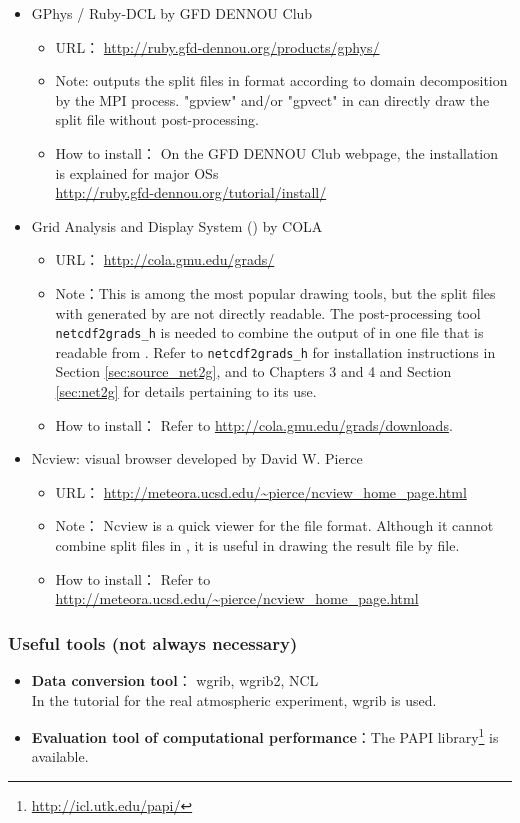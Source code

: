\begin{itemize}
\item GPhys / Ruby-DCL by GFD DENNOU Club
 \begin{itemize}
  \item URL： \url{http://ruby.gfd-dennou.org/products/gphys/}
  \item Note: \scalelib outputs the split files
  in {\netcdf} format according to domain decomposition by the MPI process.
  "gpview" and/or "gpvect" in {\gphys} can directly draw the split file without post-processing.
  \item How to install：
  On the GFD DENNOU Club webpage, the installation is explained for major OSs\\
  \url{http://ruby.gfd-dennou.org/tutorial/install/}\\
   \end{itemize}
\item Grid Analysis and Display System (\grads) by COLA
 \begin{itemize}
  \item URL： \url{http://cola.gmu.edu/grads/}
  \item Note：This is among the most popular drawing tools,
  but the split files with {\netcdf} generated by \scalelib are not directly readable.
  The post-processing tool \verb|netcdf2grads_h| is needed to combine the output of \scalelib in one file that is readable from \grads. Refer to \verb|netcdf2grads_h| for installation instructions in Section \ref{sec:source_net2g}, and to Chapters 3 and 4 and Section \ref{sec:net2g} for details pertaining to its use.
  \item How to install： Refer to \url{http://cola.gmu.edu/grads/downloads}.
 \end{itemize}
\item Ncview: {\netcdf} visual browser developed by David W. Pierce
 \begin{itemize}
  \item URL： \url{http://meteora.ucsd.edu/~pierce/ncview_home_page.html}
  \item Note： Ncview is a quick viewer for the {\netcdf} file format.
  Although it cannot combine split files in \scalelib, it is useful in drawing the result file by file.
  \item How to install： Refer to \url{http://meteora.ucsd.edu/~pierce/ncview_home_page.html}
 \end{itemize}
\end{itemize}


\subsubsection{Useful tools (not always necessary)}
\begin{itemize}
  \item {\bf Data conversion tool}： wgrib, wgrib2, NCL\\
  In the tutorial for the real atmospheric experiment, wgrib is used.
  \item {\bf Evaluation tool of computational performance}：The PAPI library\footnote{\url{http://icl.utk.edu/papi/}} is available.
\end{itemize}

